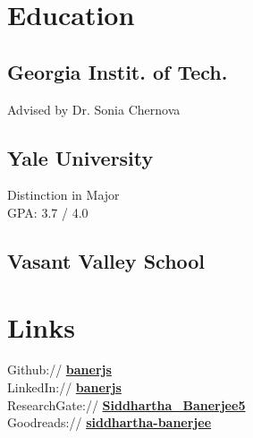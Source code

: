 \documentclass[]{_deedy-resume}
\begin{document}
%
%
\lastupdated

%
%

%
%

\begin{minipage}[t]{0.33\textwidth}


\section{Education}

\subsection{Georgia Instit. of Tech.}
Advised by Dr. Sonia Chernova
\sectionsep

\subsection{Yale University}
Distinction in Major \\
GPA: 3.7 / 4.0
\sectionsep

\subsection{Vasant Valley School}


\section{Links}
Github:// \href{https://github.com/banerjs}{\bf banerjs} \\
LinkedIn://  \href{https://www.linkedin.com/in/banerjs}{\bf banerjs} \\
ResearchGate://  \href{https://www.researchgate.net/profile/Siddhartha\_Banerjee5}{\bf Siddhartha\_Banerjee5} \\
Goodreads:// \href{https://www.goodreads.com/user/show/41408373-siddhartha-banerjee}{\bf siddhartha-banerjee}


\end{minipage}
\end{document}
